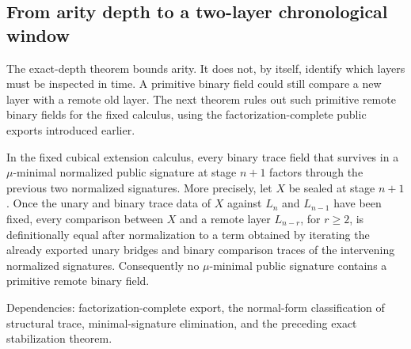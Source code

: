 \documentclass{lmcs}
\begin{document}
\subsection{From arity depth to a two-layer chronological window}
\label{subsec:recent-history}

The exact-depth theorem bounds arity.  It does not, by itself, identify which layers must be
inspected in time.  A primitive binary field could still compare a new layer with a remote
old layer.  The next theorem rules out such primitive remote binary fields for the fixed
calculus, using the factorization-complete public exports introduced earlier.

\begin{thm}
\label{thm:recent-history-factorization}
In the fixed cubical extension calculus, every binary trace field that survives in a
\(\mu\)-minimal normalized public signature at stage \(n+1\) factors through the previous two
normalized signatures.  More precisely, let \(X\) be sealed at stage \(n+1\).  Once the unary
and binary trace data of \(X\) against \(L_n\) and \(L_{n-1}\) have been fixed, every
comparison between \(X\) and a remote layer \(L_{n-r}\), for \(r\geq 2\), is
definitionally equal after normalization to a term obtained by iterating the already exported
unary bridges and binary comparison traces of the intervening normalized signatures.
Consequently no \(\mu\)-minimal public signature contains a primitive remote binary field.

Dependencies: factorization-complete export, the normal-form classification of structural
trace, minimal-signature elimination, and the preceding exact stabilization theorem.
\end{thm}
\end{document}
